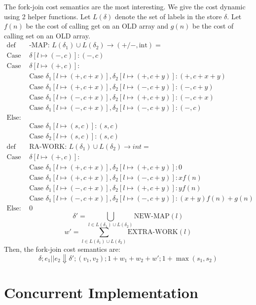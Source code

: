 \documentclass[preprint]{sigplanconf}
\begin{document}
The fork-join cost semantics are the most interesting. We give the cost dynamic using 2 helper functions. Let $L(\delta)$ denote the set of labels in the store $\delta$. Let $f(n)$ be the cost of calling get on an OLD array and $g(n)$ be the cost of calling set on an OLD array.
\begin{align*}
\text{def NEW}&\text{-MAP: }L(\delta_1) \cup L(\delta_2) \to (+/-, \text{int}) = \\
\text{Case } &\delta[l \mapsto (-,c)]: (-, c)  \\
\text{Case } &\delta[l \mapsto (+,c)]:  \\
&\text{Case } \delta_1[l \mapsto (+,c+x)], \delta_2[l \mapsto (+,c+y)]: (+, c+x+y) \\
&\text{Case } \delta_1[l \mapsto (+,c+x)], \delta_2[l \mapsto (-,c+y)]: (-, c+y) \\
&\text{Case } \delta_1[l \mapsto (-,c+x)], \delta_2[l \mapsto (+,c+y)]: (-, c+x) \\
&\text{Case } \delta_1[l \mapsto (-,c+x)], \delta_2[l \mapsto (-,c+y)]: (-, c) \\
\text{Else: } & \\
&\text{Case } \delta_1[l \mapsto (s,c)]: (s,c) \\
&\text{Case } \delta_2[l \mapsto (s,c)]: (s,c) \\
\text{def EXT}&\text{RA-WORK: }L(\delta_1) \cup L(\delta_2) \to int = \\
\text{Case } &\delta[l \mapsto (+,c)]:  \\
&\text{Case } \delta_1[l \mapsto (+,c+x)], \delta_2[l \mapsto (+,c+y)]: 0 \\
&\text{Case } \delta_1[l \mapsto (+,c+x)], \delta_2[l \mapsto (-,c+y)]: x f(n) \\
&\text{Case } \delta_1[l \mapsto (-,c+x)], \delta_2[l \mapsto (+,c+y)]: y f(n) \\
&\text{Case } \delta_1[l \mapsto (-,c+x)], \delta_2[l \mapsto (-,c+y)]: (x+y)f(n) + g(n) \\
\text{Else: } & 0
\end{align*}											
$$\delta' = \bigcup_{l \in L(\delta_1) \cup L(\delta_2)} \text{NEW-MAP} (l)$$
$$w' = \sum_{l \in L(\delta_1) \cup L(\delta_2)} \text{EXTRA-WORK} (l)$$
Then, the fork-join cost semantics are:
$$\delta; e_1 || e_2 \Downarrow \delta'; (v_1, v_2); 1 + w_1 + w_2 + w'; 1 + \max(s_1, s_2)$$

\section{Concurrent Implementation}
\end{document}
